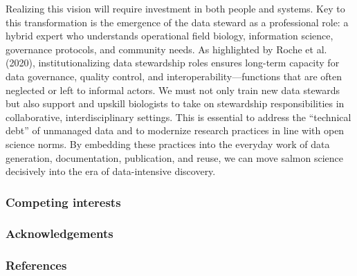 \documentclass[
  letterpaper,
  DIV=11,
  numbers=noendperiod]{scrartcl}
\begin{document}
Realizing this vision will require investment in both people and
systems. Key to this transformation is the emergence of the data steward
as a professional role: a hybrid expert who understands operational
field biology, information science, governance protocols, and community
needs. As highlighted by Roche et al. (2020), institutionalizing data
stewardship roles ensures long-term capacity for data governance,
quality control, and interoperability---functions that are often
neglected or left to informal actors. We must not only train new data
stewards but also support and upskill biologists to take on stewardship
responsibilities in collaborative, interdisciplinary settings. This is
essential to address the ``technical debt'' of unmanaged data and to
modernize research practices in line with open science norms. By
embedding these practices into the everyday work of data generation,
documentation, publication, and reuse, we can move salmon science
decisively into the era of data-intensive discovery.

\subsubsection{Competing interests}\label{competing-interests}

\subsubsection{Acknowledgements}\label{acknowledgements}

\subsubsection{References}\label{references}
\end{document}
